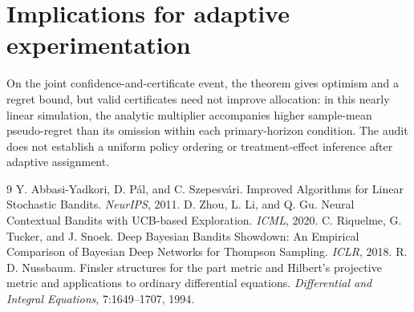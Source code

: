 \documentclass[10pt]{article}
\theoremstyle{definition}
\begin{document}
\section{Implications for adaptive experimentation}
On the joint confidence-and-certificate event, the theorem gives optimism and
a regret bound, but valid certificates need not improve allocation: in this
nearly linear simulation, the analytic multiplier accompanies higher sample-mean
pseudo-regret than its omission within each primary-horizon condition.
The audit does not establish a uniform policy ordering or treatment-effect
inference after adaptive assignment.

\vspace{-0.25em}
\begin{thebibliography}{9}\setlength{\itemsep}{0pt}\setlength{\parskip}{0pt}\small
{} Y. Abbasi-Yadkori, D. P\'al, and C. Szepesv\'ari. Improved Algorithms for Linear Stochastic Bandits. \emph{NeurIPS}, 2011.
 D. Zhou, L. Li, and Q. Gu. Neural Contextual Bandits with UCB-based Exploration. \emph{ICML}, 2020.
 C. Riquelme, G. Tucker, and J. Snoek. Deep Bayesian Bandits Showdown: An Empirical Comparison of Bayesian Deep Networks for Thompson Sampling. \emph{ICLR}, 2018.
 R. D. Nussbaum. Finsler structures for the part metric and Hilbert's projective metric and applications to ordinary differential equations. \emph{Differential and Integral Equations}, 7:1649--1707, 1994.
\end{thebibliography}
\end{document}
